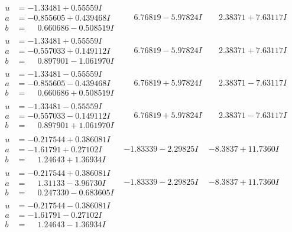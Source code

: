 \documentclass[1p]{elsarticle_modified}
\theoremstyle{definition}
\begin{document}
$$\begin{array}{c|c|c}
\begin{aligned}
u &= -1.33481 + 0.55559 I \\
a &= -0.855605 + 0.439468 I \\
b &= \phantom{-}0.660686 - 0.508519 I\end{aligned}
 & \phantom{-}6.76819 - 5.97824 I & \phantom{-}2.38371 + 7.63117 I \\ \hline\begin{aligned}
u &= -1.33481 + 0.55559 I \\
a &= -0.557033 + 0.149112 I \\
b &= \phantom{-}0.897901 - 1.061970 I\end{aligned}
 & \phantom{-}6.76819 - 5.97824 I & \phantom{-}2.38371 + 7.63117 I \\ \hline\begin{aligned}
u &= -1.33481 - 0.55559 I \\
a &= -0.855605 - 0.439468 I \\
b &= \phantom{-}0.660686 + 0.508519 I\end{aligned}
 & \phantom{-}6.76819 + 5.97824 I & \phantom{-}2.38371 - 7.63117 I \\ \hline\begin{aligned}
u &= -1.33481 - 0.55559 I \\
a &= -0.557033 - 0.149112 I \\
b &= \phantom{-}0.897901 + 1.061970 I\end{aligned}
 & \phantom{-}6.76819 + 5.97824 I & \phantom{-}2.38371 - 7.63117 I \\ \hline\begin{aligned}
u &= -0.217544 + 0.386081 I \\
a &= -1.61791 + 0.27102 I \\
b &= \phantom{-}1.24643 + 1.36934 I\end{aligned}
 & -1.83339 - 2.29825 I & -8.3837 + 11.7360 I \\ \hline\begin{aligned}
u &= -0.217544 + 0.386081 I \\
a &= \phantom{-}1.31133 - 3.96730 I \\
b &= \phantom{-}0.247330 - 0.683605 I\end{aligned}
 & -1.83339 - 2.29825 I & -8.3837 + 11.7360 I \\ \hline\begin{aligned}
u &= -0.217544 - 0.386081 I \\
a &= -1.61791 - 0.27102 I \\
b &= \phantom{-}1.24643 - 1.36934 I\end{aligned}

\end{array}$$
\end{document}
